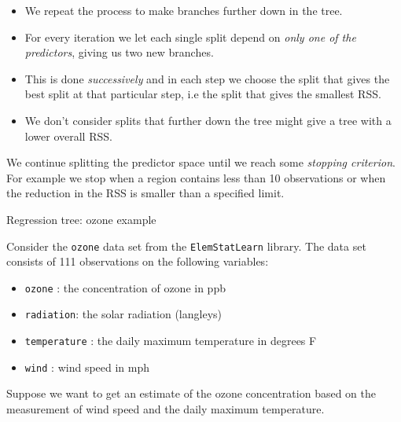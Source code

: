 \documentclass[10pt,ignorenonframetext,]{beamer}
\providecommand{\tightlist}{%
  \setlength{\itemsep}{0pt}\setlength{\parskip}{0pt}}
\begin{document}
\begin{frame}

\begin{itemize}
\tightlist
\item
  We repeat the process to make branches further down in the tree.
\item
  For every iteration we let each single split depend on \emph{only one
  of the predictors}, giving us two new branches.
\item
  This is done \emph{successively} and in each step we choose the split
  that gives the best split at that particular step, i.e the split that
  gives the smallest RSS.
\item
  We don't consider splits that further down the tree might give a tree
  with a lower overall RSS.
\end{itemize}

We continue splitting the predictor space until we reach some
\emph{stopping criterion}. For example we stop when a region contains
less than 10 observations or when the reduction in the RSS is smaller
than a specified limit.

\end{frame}

\begin{frame}[fragile]

\begin{block}{Regression tree: ozone example}

Consider the \texttt{ozone} data set from the \texttt{ElemStatLearn}
library. The data set consists of 111 observations on the following
variables:

\begin{itemize}
\tightlist
\item
  \texttt{ozone} : the concentration of ozone in ppb
\item
  \texttt{radiation}: the solar radiation (langleys)
\item
  \texttt{temperature} : the daily maximum temperature in degrees F
\item
  \texttt{wind} : wind speed in mph
\end{itemize}

Suppose we want to get an estimate of the ozone concentration based on
the measurement of wind speed and the daily maximum temperature.

\end{block}

\end{frame}
\end{document}
